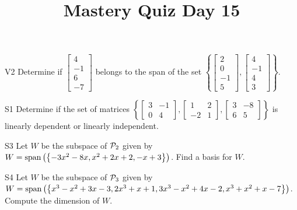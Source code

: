 \documentclass{sbgLAquiz}
\title{Mastery Quiz Day 15 }
\begin{document}
\begin{problem}{V2}
  Determine if
  \(\begin{bmatrix} 4 \\ -1 \\ 6 \\ -7 \end{bmatrix}\)
  belongs to the span of the set
  \(\left\{
    \begin{bmatrix} 2 \\ 0 \\ -1 \\ 5 \end{bmatrix},
    \begin{bmatrix} 4 \\ -1 \\ 4 \\ 3 \end{bmatrix}
    \right\}
  \).
\end{problem}

\begin{problem}{S1}
Determine if the set of matrices $\left\{\begin{bmatrix} 3 & -1 \\ 0 & 4 \end{bmatrix}, \begin{bmatrix} 1  & 2 \\ -2 & 1 \end{bmatrix}, \begin{bmatrix} 3 & -8 \\ 6 & 5 \end{bmatrix} \right\}$  is linearly dependent or linearly independent.
\end{problem}
\newpage

\begin{problem}{S3}
Let $W$ be the subspace of $\P_2$ given by $W = {\rm span} \left( \left\{  -3x^2-8x, x^2+2x+2, -x+3\right\} \right)$.   Find a basis for $W$.
\end{problem}

\begin{problem}{S4}
Let $W$ be the subspace of $\P_3$ given by $W={\rm span}\left( \left\{ x^3-x^2+3x-3, 2x^3+x+1, 3x^3-x^2+4x-2, x^3+x^2+x-7\right\}\right)$.  Compute the dimension of $W$.
\end{problem}
\end{document}
